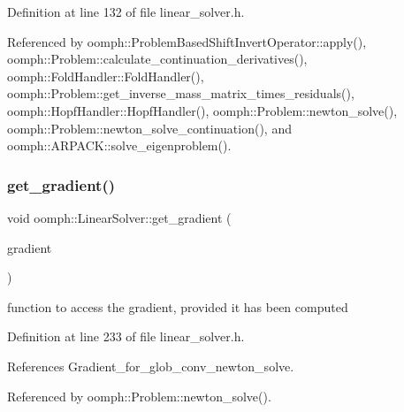 Definition at line 132 of file linear\+\_\+solver.\+h.



Referenced by oomph\+::\+Problem\+Based\+Shift\+Invert\+Operator\+::apply(), oomph\+::\+Problem\+::calculate\+\_\+continuation\+\_\+derivatives(), oomph\+::\+Fold\+Handler\+::\+Fold\+Handler(), oomph\+::\+Problem\+::get\+\_\+inverse\+\_\+mass\+\_\+matrix\+\_\+times\+\_\+residuals(), oomph\+::\+Hopf\+Handler\+::\+Hopf\+Handler(), oomph\+::\+Problem\+::newton\+\_\+solve(), oomph\+::\+Problem\+::newton\+\_\+solve\+\_\+continuation(), and oomph\+::\+A\+R\+P\+A\+C\+K\+::solve\+\_\+eigenproblem().

\mbox{\label{classoomph_1_1LinearSolver_a6733411e85f0a1d6d82200c802481681}} 
\subsubsection{\texorpdfstring{get\+\_\+gradient()}{get\_gradient()}}
{\footnotesize\ttfamily void oomph\+::\+Linear\+Solver\+::get\+\_\+gradient (\begin{DoxyParamCaption}\item[{\hyperlink{classoomph_1_1DoubleVector}{Double\+Vector} \&}]{gradient }\end{DoxyParamCaption})\hspace{0.3cm}{\ttfamily [inline]}}



function to access the gradient, provided it has been computed 



Definition at line 233 of file linear\+\_\+solver.\+h.



References Gradient\+\_\+for\+\_\+glob\+\_\+conv\+\_\+newton\+\_\+solve.



Referenced by oomph\+::\+Problem\+::newton\+\_\+solve().

\mbox{\label{classoomph_1_1LinearSolver_a451ce3af5db82f9edbddf8f417597248}} 
